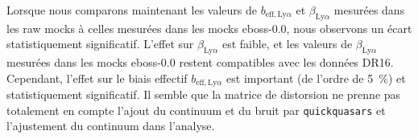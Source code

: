 Lorsque nous comparons maintenant les valeurs de $b_{\mathrm{eff},\mathrm{Ly}\alpha}$ et $\beta_{\mathrm{Ly}\alpha}$ mesurées dans les raw mocks à celles mesurées dans les mocks eboss-0.0, nous observons un écart statistiquement significatif. L'effet sur $\beta_{\mathrm{Ly}\alpha}$ est faible, et les valeurs de $\beta_{\mathrm{Ly}\alpha}$ mesurées dans les mocks eboss-0.0 restent compatibles avec les données DR16.
Cependant, l'effet sur le biais effectif $b_{\mathrm{eff},\mathrm{Ly}\alpha}$ est important (de l'ordre de \SI{5}{\percent}) et statistiquement significatif.
Il semble que la matrice de distorsion ne prenne pas totalement en compte l'ajout du continuum et du bruit par \texttt{quickquasars} et l'ajustement du continuum dans l'analyse.

